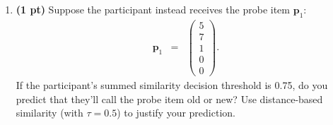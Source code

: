 \documentclass[11pt]{article}
\begin{document}
\begin{enumerate}
\begin{enumerate}
\item \textbf{(1 pt)}  Suppose the participant instead receives the probe item
  $\mathbf{p}_1$:
\begin{eqnarray*}
\mathbf{p}_1&=&
\left( 
\begin{array}{c}
5\\
7\\
1\\
0\\
0
\end{array} 
\right).
\end{eqnarray*}
If the participant's summed similarity decision threshold is 0.75, do you predict
that they'll call the probe item old or new?  Use distance-based
similarity (with $\tau = 0.5$) to justify your prediction.


\end{enumerate}


\end{enumerate}
\end{document}
